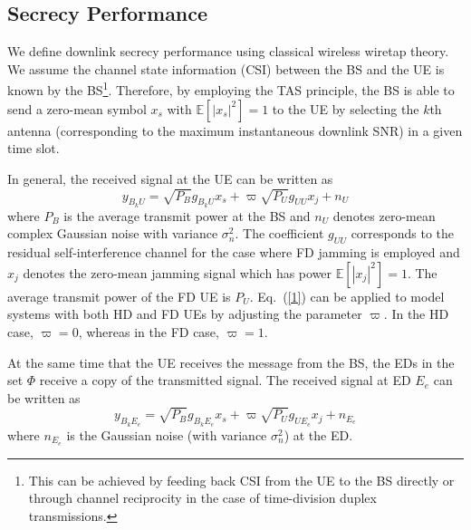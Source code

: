 \documentclass[10pt]{IEEEtran}
\begin{document}
\subsection{Secrecy Performance}
We define downlink secrecy performance using classical wireless wiretap theory. We assume the channel state information (CSI) between the BS and the UE is known by the BS\footnote{This can be achieved by feeding back CSI from the UE to the BS directly or through channel reciprocity in the case of time-division duplex transmissions.}. Therefore, by employing the TAS principle, the BS is able to send a zero-mean symbol $x_s$ with $\mathbb E[|x_s|^2]=1$ to the UE by selecting the $k$th antenna (corresponding to the maximum instantaneous downlink SNR) in a given time slot.

In general, the received signal at the UE can be written as
\begin{equation}\label{1}
   y_{B_kU} = \sqrt{P_B} g_{B_kU} x_s+ \varpi \sqrt{P_U}g_{UU}x_j + n_{U}
\end{equation}
where $P_B$ is the average transmit power at the BS and $n_U$ denotes zero-mean complex Gaussian noise with variance $\sigma_n^2$.  The coefficient $g_{UU}$ corresponds to the residual self-interference channel for the case where FD jamming is employed and $x_j$ denotes the zero-mean jamming signal which has power $\mathbb E[|x_j|^2]=1$.    The average transmit power of the FD UE is $P_U$.  Eq.~(\ref{1}) can be applied to model systems with both HD and FD UEs by adjusting the parameter $\varpi$.  In the HD case, $\varpi = 0$, whereas in the FD case, $\varpi = 1$.

At the same time that the UE receives the message from the BS, the EDs in the set $\Phi$ receive a copy of the transmitted signal.  The received signal at ED $E_e$ can be written as
\begin{equation}\label{2}
   y_{B_kE_e} = \sqrt{P_B} g_{B_kE_e} x_s + \varpi \sqrt{P_U}g_{UE_e}x_j +n_{E_e}
\end{equation}
where $n_{E_e}$ is the Gaussian noise (with variance $\sigma_n^2$) at the ED.
\end{document}
